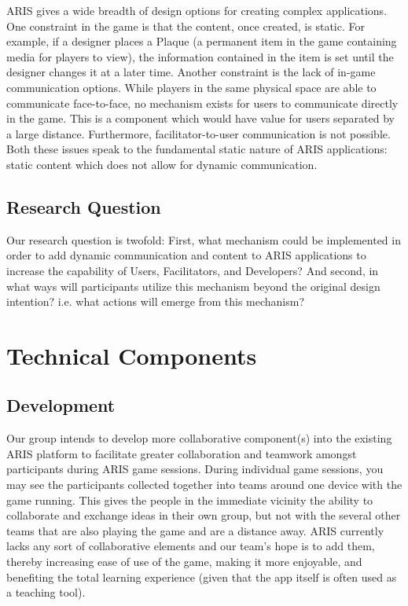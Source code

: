 \documentclass{sigchi}
\begin{document}
ARIS gives a wide breadth of design options for creating complex applications. One constraint in the game is that the content, once created, is static. For example, if a designer places a Plaque (a permanent item in the game containing media for players to view), the information contained in the item is set until the designer changes it at a later time. Another constraint is the lack of in-game communication options. While players in the same physical space are able to communicate face-to-face, no mechanism exists for users to communicate directly in the game. This is a component which would have value for users separated by a large distance. Furthermore, facilitator-to-user communication is not possible. Both these issues speak to the fundamental static nature of ARIS applications: static content  which does not allow for dynamic communication.

\subsection{Research Question}
Our research question is twofold: First, what mechanism could be implemented in order to add dynamic communication and content to ARIS applications to increase the capability of Users, Facilitators, and Developers? And second, in what ways will participants utilize this mechanism beyond the original design intention? i.e. what actions will emerge from this mechanism?

\section{Technical Components}
\subsection{Development}
Our group intends to develop more collaborative component(s) into the existing ARIS platform to facilitate greater collaboration and teamwork amongst participants during ARIS game sessions. During individual game sessions, you may see the participants collected together into teams around one device with the game running. This gives the people in the immediate vicinity the ability to collaborate and exchange ideas in their own group, but not with the several other teams that are also playing the game and are a distance away. ARIS currently lacks any sort of collaborative elements and our team’s hope is to add them, thereby increasing ease of use of the game, making it more enjoyable, and benefiting the total learning experience (given that the app itself is often used as a teaching tool).
\end{document}
